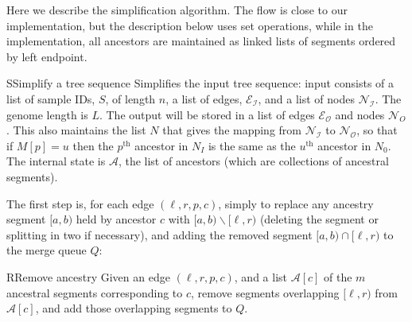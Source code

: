 \documentclass{article}
\newcommand{\setdiff}{\smallsetminus}
\begin{document}
Here we describe the simplification algorithm.
The flow is close to our implementation,
but the description below uses set operations,
while in the implementation,
all ancestors are maintained as linked lists of segments
ordered by left endpoint.

\begin{taocpalg}{S}{Simplify a tree sequence}
{Simplifies the input tree sequence:
    input consists of 
    a list of sample IDs, $S$, of length $n$,
    a list of edges, $\mathcal{E_I}$,
    and a list of nodes $\mathcal{N_I}$.
    The genome length is $L$.
    The output will be stored in a list of edges $\mathcal{E_O}$ 
    and nodes $\mathcal{N}_O$.
    This also maintains the list $N$ that gives the mapping 
    from $\mathcal{N_I}$ to $\mathcal{N_O}$,
    so that if $M[p] = u$ then the $p^\text{th}$ ancestor in $N_I$
    is the same as the $u^\text{th}$ ancestor in $N_0$.
    The internal state is $\mathcal{A}$, the list of ancestors
    (which are collections of ancestral segments).
}





\end{taocpalg}

The first step is, for each edge $(\ell, r, p, c)$,
simply to replace any ancestry segment $[a, b)$ held by ancestor $c$
with $[a,b) \setdiff [\ell, r)$ 
(deleting the segment or splitting in two if necessary),
and adding the removed segment $[a,b) \cap [\ell, r)$ to the merge queue $Q$:
\begin{taocpalg}{R}{Remove ancestry}
    {Given an edge $(\ell, r, p, c)$,
    and a list $\mathcal{A}[c]$ of the $m$ ancestral segments corresponding to $c$,
    remove segments overlapping $[\ell, r)$ from $\mathcal{A}[c]$,
    and add those overlapping segments to $Q$.
    }


    \algstep{R2.}{Add to merge queue.}{If $[a,b) \cap [\ell,r) \neq \emptyset$,
    append $(\max(a,\ell), \min(b,r), u)$ to $Q$.
    }

    \algstep{R3.}{Remove ancestry.}{If $[a,b) \cap [\ell,r) != \emptyset$,
    delete $\mathcal{A}[c][j]$ and insert in its place
    $(\min(a,\ell), \max(a,\ell), u)$ (if $a<\ell$) 
    and/or $(\min(b,r), \max(b,r), u)$ (if $r<b$).
    }

\end{taocpalg}
\end{document}
